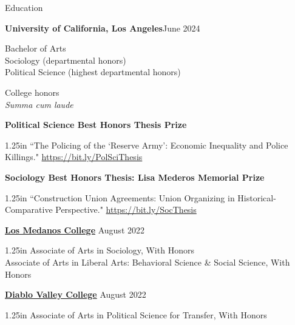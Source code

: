 \documentclass[
	12pt, %
]{resume} %
\newcommand{\righthandindent}{1.25in}
\begin{document}
\begin{rSection}{Education}

\textbf{University of California, Los Angeles}\hfill June 2024
\vspace{-6pt}
\begin{adjustwidth}{20pt}{0pt}
Bachelor of Arts\\
Sociology (departmental honors) \\
Political Science (highest departmental honors)

College honors\\
\textit{Summa cum laude}

\textbf{Political Science Best Honors Thesis Prize}
\begin{adjustwidth}{0pt}{\righthandindent} %
\vspace{-6pt}
``The Policing of the `Reserve Army': Economic Inequality and Police 
\hspace*{0.5in}Killings." \href{https://bit.ly/PolSciThesis}{https://bit.ly/PolSciThesis}
\end{adjustwidth}

\textbf{Sociology Best Honors Thesis: Lisa Mederos Memorial Prize}
\begin{adjustwidth}{0pt}{\righthandindent}
\vspace{-6pt}
``Construction Union Agreements: Union Organizing in Historical-
\hspace*{0.5in}Comparative Perspective." \href{https://bit.ly/SocThesis}{https://bit.ly/SocThesis}
\end{adjustwidth}

\end{adjustwidth}

    \textbf{\href{https://www.losmedanos.edu/}{Los Medanos College}} \hfill August 2022 
\begin{adjustwidth}{20pt}{\righthandindent}
    \vspace{-6pt}
    Associate of Arts in Sociology, With Honors\\
    Associate of Arts in Liberal Arts: Behavioral Science \& Social Science, With Honors
\end{adjustwidth}

    \textbf{\href{https://www.dvc.edu/}{Diablo Valley College}} \hfill August 2022
\begin{adjustwidth}{20pt}{\righthandindent}
    \vspace{-6pt}
    Associate of Arts in Political Science for Transfer, With Honors
\end{adjustwidth}


\end{rSection}
\end{document}
